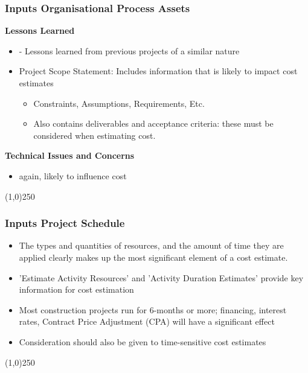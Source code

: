 \begin{frame}
\frametitle{Inputs \hfill\hfill Organisational Process Assets}
\textbf{Lessons Learned}
\begin{itemize}
	\item - Lessons learned from previous projects of a similar nature
	\item Project Scope Statement: Includes information that is likely to impact cost estimates
		\begin{itemize}
			\item Constraints, Assumptions, Requirements, Etc.
			\item Also contains deliverables and acceptance criteria: these must be considered when estimating cost.
		\end{itemize}
\end{itemize}
\textbf{Technical Issues and Concerns}
\begin{itemize}
	\item again, likely to influence cost 
\end{itemize}
\end{frame}
\begin{center}\line(1,0){250}\end{center}







\begin{frame}
\frametitle{Inputs \hfill\hfill Project Schedule}
\begin{itemize}
	\item The types and quantities of resources, and the amount of time they are applied clearly makes up the most significant element of a cost estimate.
	\item 'Estimate Activity Resources' and 'Activity Duration Estimates' provide key information for cost estimation
	\item Most construction projects run for 6-months or more; financing, interest rates, Contract Price Adjustment (CPA) will have a significant effect
	\item Consideration should also be given to time-sensitive cost estimates  
\end{itemize}
\end{frame}
\begin{center}\line(1,0){250}\end{center}






